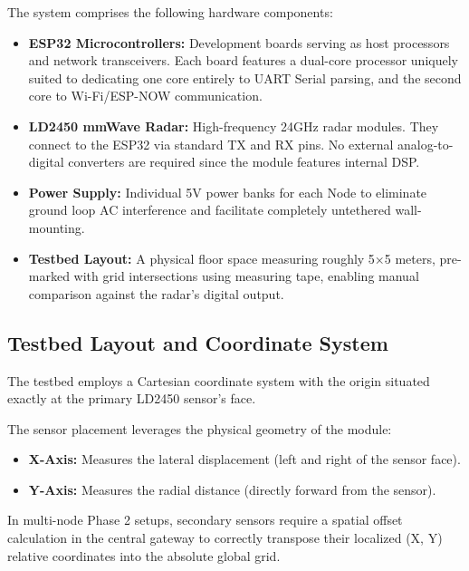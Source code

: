 The system comprises the following hardware components:

\begin{itemize}
    \item \textbf{ESP32 Microcontrollers:} Development boards serving as host processors and network transceivers. Each board features a dual-core processor uniquely suited to dedicating one core entirely to UART Serial parsing, and the second core to Wi-Fi/ESP-NOW communication.
    
    \item \textbf{LD2450 mmWave Radar:} High-frequency 24GHz radar modules. They connect to the ESP32 via standard TX and RX pins. No external analog-to-digital converters are required since the module features internal DSP.
    
    \item \textbf{Power Supply:} Individual 5V power banks for each Node to eliminate ground loop AC interference and facilitate completely untethered wall-mounting.
    
    \item \textbf{Testbed Layout:} A physical floor space measuring roughly 5×5 meters, pre-marked with grid intersections using measuring tape, enabling manual comparison against the radar's digital output.
\end{itemize}

\subsection{Testbed Layout and Coordinate System}
\label{subsec:testbed-layout}

The testbed employs a Cartesian coordinate system with the origin situated exactly at the primary LD2450 sensor's face. 

The sensor placement leverages the physical geometry of the module:
\begin{itemize}
    \item \textbf{X-Axis:} Measures the lateral displacement (left and right of the sensor face).
    \item \textbf{Y-Axis:} Measures the radial distance (directly forward from the sensor).
\end{itemize}

In multi-node Phase 2 setups, secondary sensors require a spatial offset calculation in the central gateway to correctly transpose their localized (X, Y) relative coordinates into the absolute global grid.

